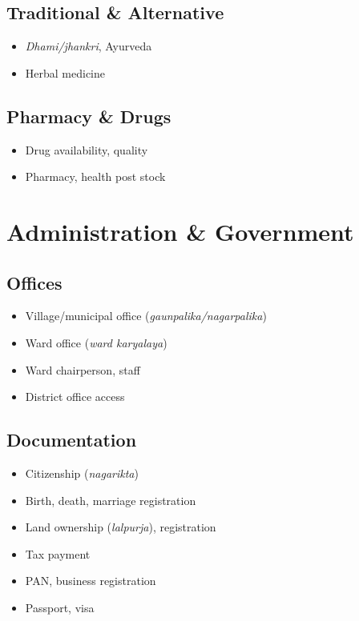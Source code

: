 \documentclass[11pt,a4paper]{article}
\begin{document}
\subsection{Traditional \& Alternative}
\begin{itemize}
    \item \textit{Dhami/jhankri}, Ayurveda
    \item Herbal medicine
\end{itemize}

\subsection{Pharmacy \& Drugs}
\begin{itemize}
    \item Drug availability, quality
    \item Pharmacy, health post stock
\end{itemize}

\section{Administration \& Government}

\subsection{Offices}
\begin{itemize}
    \item Village/municipal office (\textit{gaunpalika/nagarpalika})
    \item Ward office (\textit{ward karyalaya})
    \item Ward chairperson, staff
    \item District office access
\end{itemize}

\subsection{Documentation}
\begin{itemize}
    \item Citizenship (\textit{nagarikta})
    \item Birth, death, marriage registration
    \item Land ownership (\textit{lalpurja}), registration
    \item Tax payment
    \item PAN, business registration
    \item Passport, visa
\end{itemize}
\end{document}
